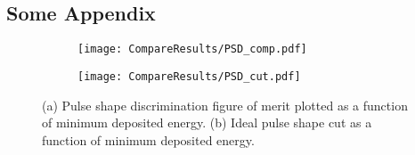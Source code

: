 \documentclass[main.tex]{subfiles}
\begin{document}
\begin{appendices}
\chapter{Some Appendix}
\begin{figure}[ht]
	\begin{subfigure}[b]{\textwidth}
	    \centering
    	\texttt{[image: CompareResults/PSD\_comp.pdf]}
        \caption{}
	    \label{fig:psd_fom_trend} 
	\end{subfigure}
	\begin{subfigure}[b]{\textwidth}
    	\centering
        \texttt{[image: CompareResults/PSD\_cut.pdf]}
        \caption{}
    	\label{fig:psd_cut_trend} 
    \end{subfigure}
    \caption{(a) Pulse shape discrimination figure of merit plotted as a function of minimum deposited energy. (b) Ideal pulse shape cut as a function of minimum deposited energy.}
\end{figure}
\end{appendices}
\end{document}
